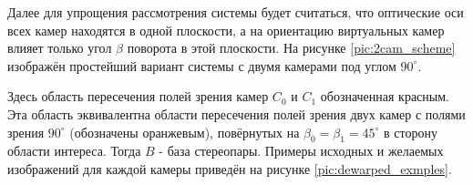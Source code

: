 Далее для упрощения рассмотрения системы будет считаться, что оптические оси всех камер находятся в одной плоскости, 
а на ориентацию виртуальных камер влияет только угол $ \beta $ поворота в этой плоскости. 
На рисунке \ref{pic:2cam_scheme} изображён простейший вариант системы с двумя камерами под углом $90^\circ$.


  Здесь область пересечения полей зрения камер $C_0$ и $C_1$ обозначенная красным.
Эта область эквивалентна области пересечения полей зрения двух камер с полями зрения $90^\circ$ (обозначены
оранжевым), повёрнутых на $\beta_0 = \beta_1  = 45^\circ$ в сторону области интереса. Тогда $B$ - база стереопары.
Примеры исходных и желаемых изображений для каждой камеры приведён на рисунке \ref{pic:dewarped_exmples}. 



